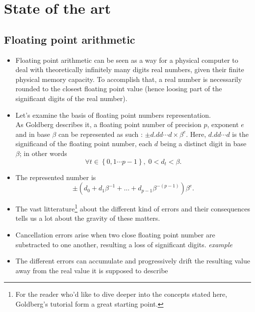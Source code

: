 \documentclass[a4paper,11pt]{article}
\let\cite=\supercite
\begin{document}
\section{State of the art} %
\subsection{Floating point arithmetic}
\begin{itemize}
  \item Floating point arithmetic can be seen as a way for a physical computer to deal with theoretically infinitely many digits real numbers, given their finite physical memory capacity. To accomplish that, a real number is necessarily rounded to the closest floating point value (hence loosing part of the significant digits of the real number).
  \item Let's examine the basis of floating point numbers representation. \\ As Goldberg\cite{Goldberg1991} describes it, a floating point number of precision $\mathit{p}$, exponent $\mathit{e}$ and in base $\beta$ can be represented as such : $ \pm \mathit{d.dd\cdots d \times \beta^{e}} $. Here, $\mathit{d.dd\cdots d}$ is the significand of the floating point number, each $\mathit{d}$ being a distinct digit in base $\beta$; in other words \[ \forall \mathit{t} \in \left\lbrace 0,1\cdots p-1 \right\rbrace, \; 0 < \mathit{d}_{t} < \beta. \]
  \item The represented number is
  \begin{equation}
  \pm \left( \mathit{d}_{0} + \mathit{d}_{1} \beta^{-1} + ... + \mathit{d}_{p-1} \beta^{- \left( \mathit{p} - 1 \right)} \right) \beta^{e}.  
  \end{equation}
  \item The vast litterature\footnote{For the reader who'd like to dive deeper into the concepts stated here, Goldberg's\cite{Goldberg1991} tutorial form a great starting point.} 
  about the different kind of errors and their consequences tells us a lot about the gravity of these matters. 
  \item Cancellation errors arise when two close floating point number are substracted to one another, resulting a loss of significant digits. \emph{example} 
  \item The different errors can accumulate and progressively drift the resulting value away from the real value it is supposed to describe %

\end{itemize}
\end{document}
